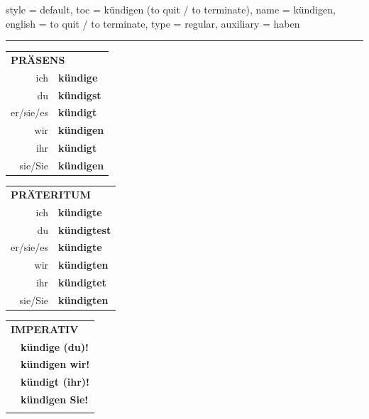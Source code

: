 \begin{verbentry}{
  style = {default},
  toc = {kündigen (to quit / to terminate)},
  name = {kündigen},
  english = {to quit / to terminate},
  type = {regular},
  auxiliary = {haben}
}
 
    
     \vspace{5pt}

    \hrule
    
    \vspace{5pt}

  \begin{tabular}{rl}
     \multicolumn{2}{l}{\textbf{PRÄSENS} }\\
    ich & \textbf{kündige}\\
    du & \textbf{kündigst}\\
    er/sie/es & \textbf{kündigt}\\
    wir & \textbf{kündigen}\\
    ihr & \textbf{kündigt}\\
    sie/Sie & \textbf{kündigen}\\
  \end{tabular}
  \hfill
     \begin{tabular}{rl}
    \multicolumn{2}{l}{\textbf{PRÄTERITUM} }\\
    ich & \textbf{kündigte}\\
    du & \textbf{kündigtest}\\
    er/sie/es & \textbf{kündigte}\\
    wir & \textbf{kündigten}\\
    ihr & \textbf{kündigtet}\\
    sie/Sie & \textbf{kündigten}\\
  \end{tabular}
  \hfill
  \begin{tabular}{rl}
     \multicolumn{2}{l}{\textbf{IMPERATIV} }\\
   & \textbf{kündige (du)!}\\
   & \textbf{kündigen wir!}\\
   & \textbf{kündigt (ihr)!}\\
   & \textbf{kündigen Sie!}\\
   & \vspace{10pt}
  \end{tabular}

    \vspace{10pt}


\end{verbentry}
